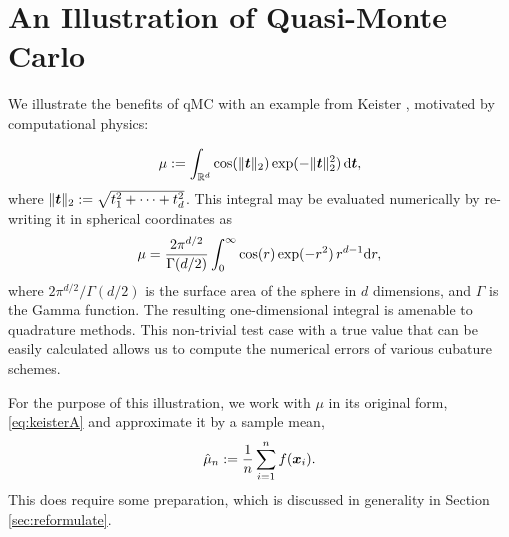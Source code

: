 \documentclass{svproc}
\begin{document}
%
\section{An Illustration of Quasi-Monte Carlo} \label{sec:practice}

We illustrate the benefits of qMC with an example from Keister \cite{Kei96}, motivated by computational physics:

\begin{equation}\label{eq:keisterA}
	\mu := \int_{\mathbb{R}^d} \cos(\lVert {\boldsymbol{t}} \rVert_2) \exp(-\lVert {\boldsymbol{t}} \rVert_2^2) \, {\mathrm{d}} {\boldsymbol{t}},
\end{equation}
where $\lVert {\boldsymbol{t}} \rVert_2 := \sqrt{t_1^2 + \cdots + t_d^2}$.  This integral may be evaluated numerically by re-writing it in spherical coordinates as
\begin{equation}\label{eq:keisterExact}
	\mu = \frac{2 \pi^{d/2}}{\Gamma(d/2)}\int_{0}^{\infty} \cos(r) \exp(-r^2) \, r^{d-1} {\mathrm{d}} r,
\end{equation}
where $2 \pi^{d/2}/\Gamma(d/2)$ is the surface area of the sphere in $d$ dimensions, and $\Gamma$ is the Gamma function.  The resulting one-dimensional integral is amenable to quadrature methods.  This non-trivial test case with a true value that can be easily calculated allows us to compute the numerical errors of various cubature schemes.

For the purpose of this illustration, we work with $\mu$ in its original form, \eqref{eq:keisterA} and approximate it by a sample mean,
\begin{equation} \label{eq:sample_mean}
	\hat{\mu}_n := \frac 1n \sum_{i=1}^n f({\boldsymbol{x}}_i).
\end{equation}
This does require some preparation, which is discussed in generality in Section \ref{sec:reformulate}.
\end{document}
